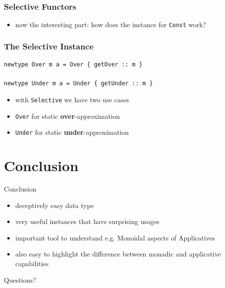 \documentclass[aspectratio=169]{beamer}
\begin{document}
\begin{frame}
  \frametitle{Selective Functors}
\end{frame}

\begin{frame}[fragile]
  \begin{itemize}
  \item now the interesting part: how does the instance for \texttt{Const} work?
  \end{itemize}
\end{frame}

\begin{frame}[fragile]
  \frametitle{The Selective Instance}
  \begin{verbatim}
newtype Over m a = Over { getOver :: m }

newtype Under m a = Under { getUnder :: m }
  \end{verbatim}
  \vfill
  \begin{itemize}
  \item with \texttt{Selective} we have two use cases
  \item \texttt{Over} for static \textbf{over}-approximation
  \item \texttt{Under} for static \textbf{under}-approximation
  \end{itemize}
\end{frame}

\section{Conclusion}
\begin{frame}
  \begin{center}
    \Huge Conclusion
  \end{center}
\end{frame}

\begin{frame}
  \begin{itemize}
  \item deceptively easy data type
  \item very useful instances that have surprising usages
  \item important tool to understand e.g. Monoidal aspects of
    Applicatives
  \item also easy to highlight the difference between monadic and
    applicative capabilities
  \end{itemize}
\end{frame}

\begin{frame}
  \Huge{}
  Questions?
\end{frame}

\appendix{}
\end{document}
